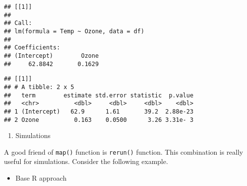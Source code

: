 \documentclass[
]{book}
\newenvironment{Shaded}{\begin{snugshade}}{\end{snugshade}}
\newcommand{\CommentTok}[1]{\textcolor[rgb]{0.56,0.35,0.01}{\textit{#1}}}
\newcommand{\DataTypeTok}[1]{\textcolor[rgb]{0.13,0.29,0.53}{#1}}
\newcommand{\DecValTok}[1]{\textcolor[rgb]{0.00,0.00,0.81}{#1}}
\newcommand{\KeywordTok}[1]{\textcolor[rgb]{0.13,0.29,0.53}{\textbf{#1}}}
\newcommand{\NormalTok}[1]{#1}
\newcommand{\OperatorTok}[1]{\textcolor[rgb]{0.81,0.36,0.00}{\textbf{#1}}}
\newcommand{\StringTok}[1]{\textcolor[rgb]{0.31,0.60,0.02}{#1}}
\providecommand{\tightlist}{%
  \setlength{\itemsep}{0pt}\setlength{\parskip}{0pt}}
\begin{document}
\begin{verbatim}
## [[1]]
## 
## Call:
## lm(formula = Temp ~ Ozone, data = df)
## 
## Coefficients:
## (Intercept)        Ozone  
##     62.8842       0.1629
\end{verbatim}

\begin{Shaded}
\end{Shaded}

\begin{verbatim}
## [[1]]
## # A tibble: 2 x 5
##   term        estimate std.error statistic  p.value
##   <chr>          <dbl>     <dbl>     <dbl>    <dbl>
## 1 (Intercept)   62.9      1.61       39.2  2.88e-23
## 2 Ozone          0.163    0.0500      3.26 3.31e- 3
\end{verbatim}

\begin{enumerate}
\def\labelenumi{\arabic{enumi}.}
\setcounter{enumi}{1}
\tightlist
\item
  Simulations
\end{enumerate}

A good friend of \texttt{map()} function is \texttt{rerun()} function. This combination is really useful for simulations. Consider the following example.

\begin{itemize}
\tightlist
\item
  Base R approach
\end{itemize}
\end{document}
